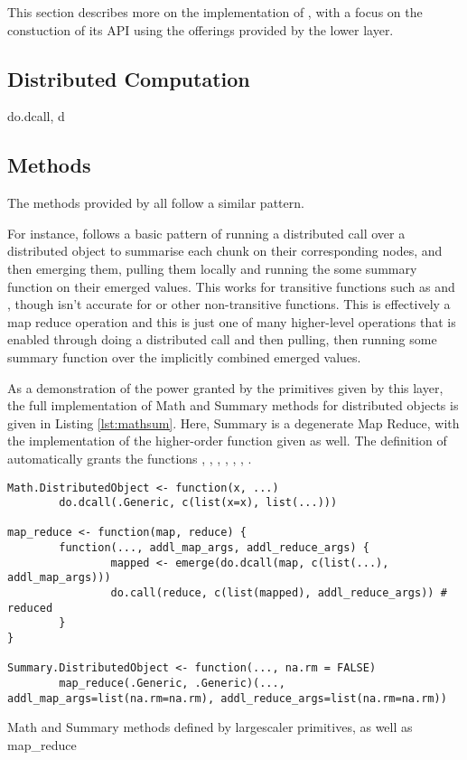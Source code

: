 This section describes more on the implementation of , with a focus on the constuction of its API using the offerings provided by the lower layer.

\subsection{Distributed Computation}

do.dcall, d

\subsection{Methods}

The methods provided by \lsr all follow a similar pattern.

For instance,  follows a basic pattern of running a distributed call over a distributed object to summarise each chunk on their corresponding nodes, and then emerging them, pulling them locally and running the some summary function on their  emerged values.
This works for transitive functions such as  and , though isn't accurate for  or other non-transitive functions.
This is effectively a map reduce operation and this is just one of many higher-level operations that is enabled through doing a distributed call and then pulling, then running some summary function over the implicitly combined emerged values.

As a demonstration of the power granted by the primitives given by this layer, the full implementation of Math and Summary methods for distributed objects is given in Listing \ref{lst:mathsum}.
Here, Summary is a degenerate Map Reduce, with the implementation of the higher-order  function given as well. The definition of  automatically grants the functions , , , , , , . 

\begin{listing}
\begin{verbatim}
Math.DistributedObject <- function(x, ...)
        do.dcall(.Generic, c(list(x=x), list(...)))

map_reduce <- function(map, reduce) {
        function(..., addl_map_args, addl_reduce_args) {
                mapped <- emerge(do.dcall(map, c(list(...), addl_map_args)))
                do.call(reduce, c(list(mapped), addl_reduce_args)) # reduced
        }
}

Summary.DistributedObject <- function(..., na.rm = FALSE)  
        map_reduce(.Generic, .Generic)(..., addl_map_args=list(na.rm=na.rm), addl_reduce_args=list(na.rm=na.rm)) 
\end{verbatim}
\caption{Math and Summary methods defined by largescaler primitives, as well as map\_reduce}
\label{lst:mathsum}
\end{listing}

